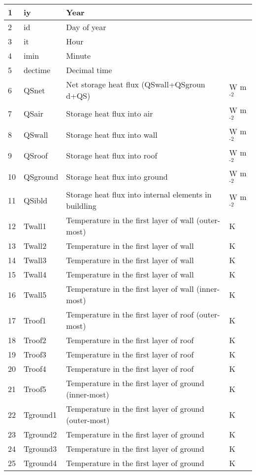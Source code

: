 \documentclass[letterpaper,10pt,english]{sphinxmanual}
\begin{document}
\begin{savenotes}
\begin{longtable}{|l|l|l|l|}
1
&
iy
&
Year
&\\
\hline
2
&
id
&
Day of year
&\\
\hline
3
&
it
&
Hour
&\\
\hline
4
&
imin
&
Minute
&\\
\hline
5
&
dectime
&
Decimal time
&\\
\hline
6
&
QSnet
&
Net storage
heat flux
(QSwall+QSgroun
d+QS)
&
W m$^{\text{-2}}$
\\
\hline
7
&
QSair
&
Storage heat
flux into air
&
W m$^{\text{-2}}$
\\
\hline
8
&
QSwall
&
Storage heat
flux into wall
&
W m$^{\text{-2}}$
\\
\hline
9
&
QSroof
&
Storage heat
flux into roof
&
W m$^{\text{-2}}$
\\
\hline
10
&
QSground
&
Storage heat
flux into
ground
&
W m$^{\text{-2}}$
\\
\hline
11
&
QSibld
&
Storage heat
flux into
internal
elements in
buildling
&
W m$^{\text{-2}}$
\\
\hline
12
&
Twall1
&
Temperature in
the first layer
of wall
(outer-most)
&
K
\\
\hline
13
&
Twall2
&
Temperature in
the first layer
of wall
&
K
\\
\hline
14
&
Twall3
&
Temperature in
the first layer
of wall
&
K
\\
\hline
15
&
Twall4
&
Temperature in
the first layer
of wall
&
K
\\
\hline
16
&
Twall5
&
Temperature in
the first layer
of wall
(inner-most)
&
K
\\
\hline
17
&
Troof1
&
Temperature in
the first layer
of roof
(outer-most)
&
K
\\
\hline
18
&
Troof2
&
Temperature in
the first layer
of roof
&
K
\\
\hline
19
&
Troof3
&
Temperature in
the first layer
of roof
&
K
\\
\hline
20
&
Troof4
&
Temperature in
the first layer
of roof
&
K
\\
\hline
21
&
Troof5
&
Temperature in
the first layer
of ground
(inner-most)
&
K
\\
\hline
22
&
Tground1
&
Temperature in
the first layer
of ground
(outer-most)
&
K
\\
\hline
23
&
Tground2
&
Temperature in
the first layer
of ground
&
K
\\
\hline
24
&
Tground3
&
Temperature in
the first layer
of ground
&
K
\\
\hline
25
&
Tground4
&
Temperature in
the first layer
of ground
&
K
\\

\end{longtable}
\end{savenotes}
\end{document}
